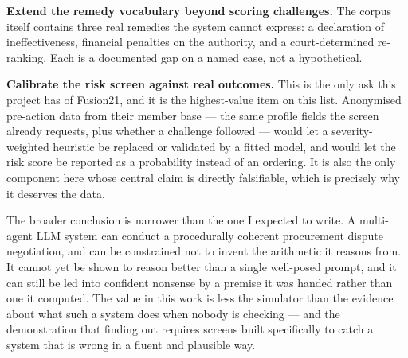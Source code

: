 \textbf{Extend the remedy vocabulary beyond scoring challenges.} The corpus itself
contains three real remedies the system cannot express: a declaration of
ineffectiveness, financial penalties on the authority, and a court-determined
re-ranking. Each is a documented gap on a named case, not a hypothetical.

\textbf{Calibrate the risk screen against real outcomes.} This is the only ask
this project has of Fusion21, and it is the highest-value item on this list.
Anonymised pre-action data from their member base --- the same profile fields the
screen already requests, plus whether a challenge followed --- would let a
severity-weighted heuristic be replaced or validated by a fitted model, and would
let the risk score be reported as a probability instead of an ordering. It is also
the only component here whose central claim is directly falsifiable, which is
precisely why it deserves the data.

The broader conclusion is narrower than the one I expected to write. A
multi-agent LLM system can conduct a procedurally coherent procurement dispute
negotiation, and can be constrained not to invent the arithmetic it reasons from.
It cannot yet be shown to reason better than a single well-posed prompt, and it
can still be led into confident nonsense by a premise it was handed rather than one
it computed. The value in this work is less the simulator than the evidence about
what such a system does when nobody is checking --- and the demonstration that
finding out requires screens built specifically to catch a system that is wrong in
a fluent and plausible way.
